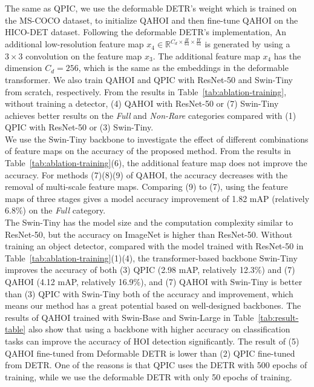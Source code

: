 \documentclass[10pt,twocolumn,letterpaper]{article}
\begin{document}
\space The same as QPIC, we use the deformable DETR's weight which is trained on the MS-COCO dataset, to initialize QAHOI and then fine-tune QAHOI on the HICO-DET dataset.
Following the deformable DETR's implementation,
An additional low-resolution feature map $x_{4}\in\mathbb{R}^{C_{d}\times\frac{H}{64}\times\frac{W}{64}}$ is generated
by using a $3 \times 3$ convolution on the feature map $x_3$.
The additional feature map $x_{4}$ has the dimension $C_{d}=256$, which is the same as the embeddings in the deformable transformer.
We also train QAHOI and QPIC with ResNet-50 and Swin-Tiny from scratch, respectively.
From the results in Table~\ref{tab:ablation-training}, without training a detector, (4) QAHOI with ResNet-50 or (7) Swin-Tiny achieves better results on the {\em Full} and {\em Non-Rare} categories compared with (1) QPIC with ResNet-50 or (3) Swin-Tiny.
\\
\space We use the Swin-Tiny backbone to investigate the effect of different combinations of feature maps on the accuracy of the proposed method.
From the results in Table~\ref{tab:ablation-training}(6), the additional feature map does not improve the accuracy. 
For methods (7)(8)(9) of QAHOI, the accuracy decreases with the removal of multi-scale feature maps.
Comparing (9) to (7), using the feature maps of three stages gives a model accuracy improvement of 1.82 mAP (relatively 6.8$\%$) on the {\em Full} category.
\\
\space The Swin-Tiny has the model size and the computation complexity similar to ResNet-50, but the accuracy on ImageNet is higher than ResNet-50.
Without training an object detector, compared with the model trained with ResNet-50 in Table~\ref{tab:ablation-training}(1)(4), the transformer-based backbone Swin-Tiny improves the accuracy of both (3) QPIC (2.98 mAP, relatively 12.3$\%$) and (7) QAHOI (4.12 mAP, relatively 16.9$\%$), and (7) QAHOI with Swin-Tiny is better than (3) QPIC with Swin-Tiny both of the accuracy and improvement, which means our method has a great potential based on well-designed backbones.
The results of QAHOI trained with Swin-Base and Swin-Large in Table~\ref{tab:result-table} also show that using a backbone with higher accuracy on classification tasks can improve the accuracy of HOI detection significantly.
The result of (5) QAHOI fine-tuned from Deformable DETR is lower than (2) QPIC fine-tuned from DETR. 
One of the reasons is that QPIC uses the DETR with 500 epochs of training, while we use the deformable DETR with only 50 epochs of training. 
\end{document}

